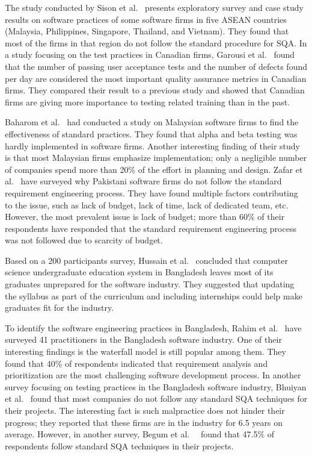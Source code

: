 The study conducted by Sison et al.~\citep{Sison2006} presents exploratory survey and case study results on software practices of some software firms in five ASEAN countries (Malaysia, Philippines, Singapore, Thailand, and Vietnam). They found that most of the firms in that region do not follow the standard procedure for SQA.
In a study focusing on the test practices in Canadian firms, Garousi et al.~\citep{Garousi2013} found that the number of passing user acceptance tests and the number of defects found per day are considered the most important quality assurance metrics in Canadian firms. They compared their result to a previous study and showed that Canadian firms are giving more importance to testing related training than in the past.

Baharom et al.~\citep{Baharom2006} had conducted a study on Malaysian software firms to find the effectiveness of standard practices. They found that alpha and beta testing was hardly implemented in software firms. Another interesting finding of their study is that most Malaysian firms emphasize implementation; only a negligible number of companies spend more than 20\% of the effort in planning and design.
Zafar et al.~\citep{Zafar2018} have surveyed why Pakistani software firms do not follow the standard requirement engineering process. They have found multiple factors contributing to the issue, such as lack of budget, lack of time, lack of dedicated team, etc. However, the most prevalent issue is lack of budget; more than 60\% of their respondents have responded that the standard requirement engineering process was not followed due to scarcity of budget.

Based on a 200 participants survey, Hussain et al.~\citep{Hussain2020} concluded that computer science undergraduate education system in Bangladesh leaves most of its graduates unprepared for the software industry. They suggested that updating the syllabus as part of the curriculum and including internships could help make graduates fit for the industry.

To identify the software engineering practices in Bangladesh, Rahim et al.~\citep{Rahim2017} have surveyed 41 practitioners in the Bangladesh software industry. One of their interesting findings is the waterfall model is still popular among them. They found that 40\% of respondents indicated that requirement analysis and prioritization are the most challenging software development process. In another survey focusing on testing practices in the Bangladesh software industry, Bhuiyan et al.~\citep{M2018} found that most companies do not follow any standard SQA techniques for their projects. The interesting fact is such malpractice does not hinder their progress; they reported that these firms are in the industry for 6.5 years on average. However, in another survey, Begum et al.~\citep{Begum2009}  found that 47.5\% of respondents follow standard SQA techniques in their projects.